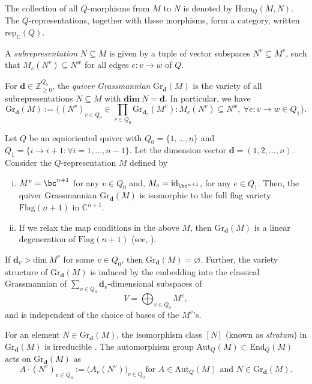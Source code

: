 \documentclass[10pt, a4paper, reqno]{amsart}
\begin{document}
The collection of all $Q$-morphisms from $M$ to $N$ is denoted by $\mbox{Hom}_Q(M,N)$.  The $Q$-representations, together with these morphisms, form a category, written $\mbox{rep}_{\mathbb{C}}(Q)$. 

A \emph{subrepresentation} $N\subseteq M$ is given by a tuple of vector subspaces $N^v\subseteq M^v$, such that $M_e(N^v)\subseteq N^w$ for all edges $e :v\to w$ of $Q$. 
 
 \begin{defe}\label{def:qG}
For $\mathbf{d}\in \mathbb{Z}_{\geq 0}^{Q_0}$, the \emph{quiver Grassmannian} $\mbox{Gr}_{\mathbf{d}}(M)$ is the variety of all subrepresentations $N\subseteq M$ with $\mathbf{dim}~ N=\mathbf{d}$. In particular, we have
\begin{equation}
	\mbox{Gr}_{\mathbf{d}}(M):=\Big\{(N^v)_{v\in Q_0}\in\prod_{v\in Q_0}	\mbox{Gr}_{\mathbf{d}_v}(M^v) : M_e(N^v)\subseteq N^w,~\forall e :v\to w \in Q_1 \Big\}.
	\end{equation}
 \end{defe}


\begin{exam}
Let $Q$ be an equioriented quiver with $Q_0=\{1,\ldots,n\}$	and $Q_1=\{i\to i+1:\forall i=1,\ldots, n-1\}$. Let the dimension vector $\mathbf{d} = (1,2,\ldots,n)$. 
Consider the $Q$-representation $M$ defined by 
\begin{enumerate}[(i)]
	\item $M^v=\bc^{n+1}$ for any $v\in Q_0$ and, $M_e=\mbox{id}_{\bc^{n+1}}$, for any $e\in Q_1$.
	Then, 	the quiver Grassmannian $\mathrm{Gr}_{\mathbf{d}}(M)$ is isomorphic to the full flag variety $\mathrm{Flag}(n+1)$ in $\mathbb{C}^{n+1}$.
	\item If we relax the map conditions in the above $M$, then $\mathrm{Gr}_{\mathbf{d}}(M)$ is a linear degeneration of  $\mathrm{Flag}(n+1)$ (see, \cite{cfffr17}).
\end{enumerate} 
\end{exam}

If $\mathbf{d}_v > \mbox{dim} ~M^v$ for some $v\in Q_0$, then $\mbox{Gr}_{\mathbf{d}}(M)=\varnothing$.  Further, the variety structure of $\mbox{Gr}_{\mathbf{d}}(M)$ is induced by the embedding into the classical Grassmannian of $\sum_{v\in Q_0} \mathbf{d}_v$-dimensional subspaces of \[V=\bigoplus_{v\in Q_0} M^v,\] and is independent of the choice of bases of the $M^v$'s.

For  an element $N \in \mbox{Gr}_{\mathbf{d}}(M)$, the isomorphism class $[N]$ (known as \emph{stratum}) in $\mbox{Gr}_{\mathbf{d}}(M)$ is irreducible \cite[Lemma 2.4]{ifr12}.
The automorphism group $\mbox{Aut}_Q(M)\subset \mbox{End}_Q(M)$ acts on $\mbox{Gr}_{\mathbf{d}}(M)$ as 
\[A\cdot (N^v)_{v\in Q_0}:= \Big(A_v(N^v)\Big)_{v\in Q_0} \text{for } A\in \mbox{Aut}_Q(M) \text{ and }  N\in \mbox{Gr}_{\mathbf{d}}(M).\]
\end{document}
